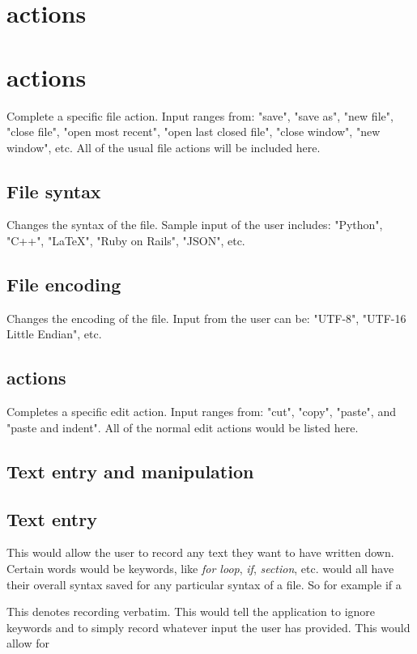 \documentclass[11pt, oneside]{article}
\begin{document}
\section{ actions}
\section{ actions}

Complete a specific file action. Input ranges from: "save", "save as", "new file", "close file", "open most recent", "open last closed file", "close window", "new window", etc. All of the usual file actions will be included here.

\subsection{File syntax}
Changes the syntax of the file. Sample input of the user includes: "Python", "C++", "\LaTeX", "Ruby on Rails", "JSON", etc.

\subsection{File encoding}
Changes the encoding of the file. Input from the user can be: "UTF-8", "UTF-16 Little Endian", etc.

\subsection{ actions}
Completes a specific edit action. Input ranges from: "cut", "copy", "paste", and "paste and indent". All of the normal edit actions would be listed here.

\subsection{Text entry and manipulation}

	\subsection{Text entry}
	This would allow the user to record any text they want to have written down. Certain words would be keywords, like \textit{for loop}, \textit{if}, \textit{section}, etc. would all have their overall syntax saved for any particular syntax of a file. So for example if a 

	This denotes recording verbatim. This would tell the application to ignore keywords and to simply record whatever input the user has provided. This would allow for 
\end{document}

